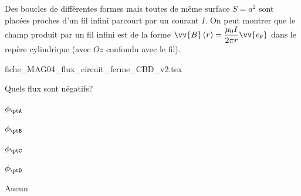 \finEntrainement





\newpage









\hauteurLargeurCadreReponse		{7mm}{1.5cm}
\initialisationEntrainement

Des boucles de différentes formes mais toutes de même surface $S=a^{2}$ sont placées proches d'un fil infini parcourt par un courant $I$. 
On peut montrer que le champ produit par un
fil infini est de la forme $\vv{B}\left(r\right)=\dfrac{\mu_{0}I}{2\pi r}\vv{e_{\theta}}$
dans le repère cylindrique (avec $Oz$ confondu avec le fil).


\begin{center}
{fiche_MAG04_flux_circuit_ferme_CBD_v2.tex}
\end{center}

\minusMedskip

\debutEntrainement


\begin{enonce}
Quels flux sont négatifs?
	
	\begin{listeQCM5Colonnes}
	\item $\phi_\ptA$
	\item $\phi_\ptB$
	\item $\phi_\ptC$
	\item $\phi_\ptD$
	\item Aucun
	\end{listeQCM5Colonnes}

\bigskip
\end{enonce}

